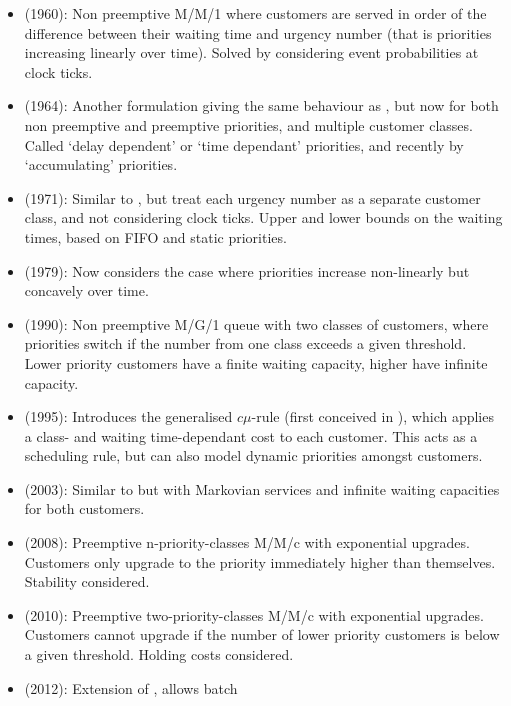 \documentclass{article}
\begin{document}
\begin{itemize}
  \item \cite{jackson60} (1960): Non preemptive M/M/1 where customers
      are served in order of the difference between their waiting time
        and urgency number (that is priorities increasing linearly over
        time). Solved by considering event probabilities at clock ticks.
  \item \cite{kleinrock164} (1964): Another formulation giving the same
      behaviour as \cite{jackson60}, but now for both non preemptive and
        preemptive priorities, and multiple customer classes. Called `delay
        dependent' or `time dependant' priorities, and recently by
        `accumulating' priorities.
  \item \cite{holtzman71} (1971): Similar to \cite{jackson60}, but treat each
      urgency number as a separate customer class, and not considering
        clock ticks. Upper and lower bounds on the waiting times, based
        on FIFO and static priorities.
  \item \cite{netterman79} (1979): Now considers the case where
      priorities increase non-linearly but concavely over time.
  \item \cite{fratini90} (1990): Non preemptive M/G/1 queue with two
      classes of customers, where priorities switch if the number from
        one class exceeds a given threshold. Lower priority customers
        have a finite waiting capacity, higher have infinite capacity.
  \item \cite{vanmieghan95} (1995): Introduces the generalised $c\mu$-rule
    (first conceived in \cite{smith56}), which applies a class- and waiting
      time-dependant cost to each customer. This acts as a scheduling rule,
      but can also model dynamic priorities amongst customers.
  \item \cite{knessl03} (2003): Similar to \cite{fratini90} but with Markovian
      services and infinite waiting capacities for both customers.
  \item \cite{xie08} (2008): Preemptive n-priority-classes M/M/c with
      exponential upgrades. Customers only upgrade to the priority
        immediately higher than themselves. Stability considered.
  \item \cite{down10} (2010): Preemptive two-priority-classes M/M/c with
      exponential upgrades. Customers cannot upgrade if the number of
        lower priority customers is below a given threshold. Holding
        costs considered.
  \item \cite{he12} (2012): Extension of \cite{down10}, allows batch

\end{itemize}
\end{document}
